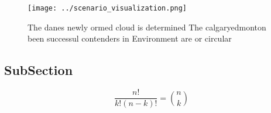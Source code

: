 \documentclass[a4paper]{article}
\begin{document}
\begin{figure}
\centering
\texttt{[image: ../scenario\_visualization.png]}
\caption{The danes newly ormed cloud is determined The calgaryedmonton been successul contenders in Environment are or circular 
}
\end{figure}
 
\subsection{SubSection}

\[ \frac{n!}{k!(n-k)!} = \binom{n}{k} \]
\end{document}
